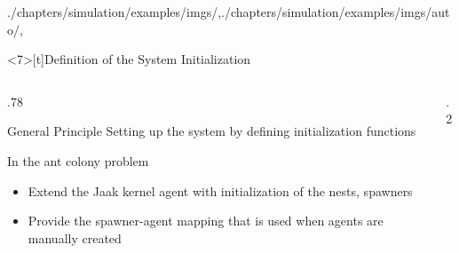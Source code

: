 \begin{graphicspathcontext}{{./chapters/simulation/examples/imgs/},{./chapters/simulation/examples/imgs/auto/},\old}
\begin{frame}<7>[t]{Definition of the System Initialization}
	\vspace{-.5cm}
	\smaller
	\begin{columns}
		\begin{column}[t]{.78\linewidth}
			\begin{alertblock}{General Principle}
			Setting up the system by defining initialization functions
			\end{alertblock}
			\begin{block}{In the ant colony problem}
				\begin{itemize}
				\item Extend the Jaak kernel agent with initialization of the nests, spawners
				\item Provide the spawner-agent mapping that is used when agents are manually created
				\end{itemize}
			\end{block}
		\end{column}
		\begin{column}[t]{.2\linewidth}
		\end{column}
	\end{columns}
\end{frame}


\end{graphicspathcontext}
